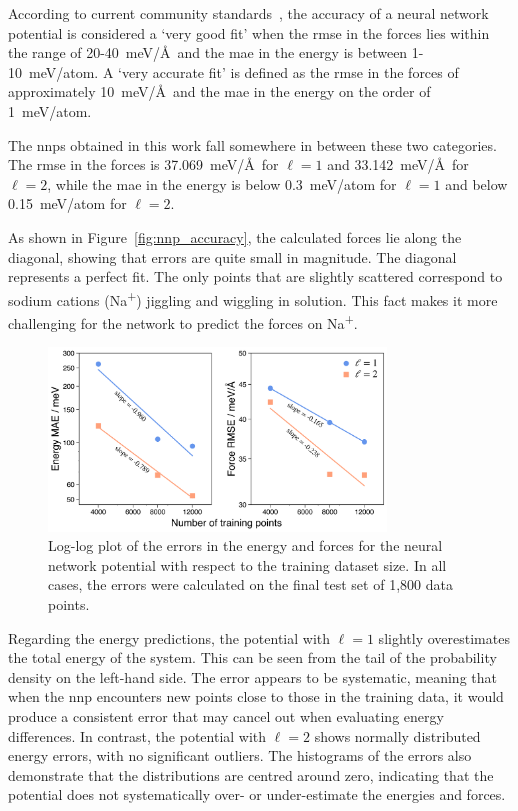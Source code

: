 According to current community standards~\citep{jacobsPracticalGuideMachine2025a}, the accuracy of a neural network potential is considered a `very good fit' when the \ac{rmse} in the forces lies within the range of 20-40~meV/\AA\ and the \ac{mae} in the energy is between 1-10~meV/atom. A `very accurate fit' is defined as the \ac{rmse} in the forces of approximately 10~meV/\AA\ and the \ac{mae} in the energy on the order of 1~meV/atom.

The \acp{nnp} obtained in this work fall somewhere in between these two categories. The \ac{rmse} in the forces is 37.069~meV/\AA\ for $\ell=1$ and 33.142~meV/\AA\ for $\ell=2$, while the \ac{mae} in the energy is below 0.3~meV/atom for $\ell=1$ and below 0.15~meV/atom for $\ell=2$.

As shown in Figure~\ref{fig:nnp_accuracy}, the calculated forces lie along the diagonal, showing that errors are quite small in magnitude. The diagonal represents a perfect fit. The only points that are slightly scattered correspond to sodium cations (Na\textsuperscript{+}) jiggling and wiggling in solution. This fact makes it more challenging for the network to predict the forces on Na\textsuperscript{+}.

\begin{figure}[b!]
    \centering
    \includegraphics[width=0.8\textwidth]{Figures/4_Results/results_nnp_loglog_energy_force.png}
    \caption{Log-log plot of the errors in the energy and forces for the neural network potential with respect to the training dataset size. In all cases, the errors were calculated on the final test set of 1,800 data points.}
    \label{fig:nnp_log-log}
\end{figure}

Regarding the energy predictions, the potential with $\ell=1$ slightly overestimates the total energy of the system. This can be seen from the tail of the probability density on the left-hand side. The error appears to be systematic, meaning that when the \ac{nnp} encounters new points close to those in the training data, it would produce a consistent error that may cancel out when evaluating energy differences. In contrast, the potential with $\ell=2$ shows normally distributed energy errors, with no significant outliers. The histograms of the errors also demonstrate that the distributions are centred around zero, indicating that the potential does not systematically over- or under-estimate the energies and forces.

